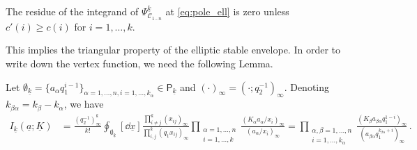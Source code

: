 \begin{lemma}
    The residue of the integrand of $\Psi_{\mathscr{C}_{1\ldots n}}^{\underline{k}}$ at \eqref{eq:pole_ell} is zero unless $c'(i) \ge c(i)$ for $i = 1 ,\ldots,k$.
\end{lemma}
This implies the triangular property of the elliptic stable envelope.
In order to write down the vertex function, we need the following Lemma.
\begin{lemma}\label{lemma:A1_pert}
    Let $\emptyset_{\underline{k}} = \{ a_\alpha q_1^{i-1} \}_{\alpha = 1,\ldots,n,i=1,\ldots,k_\alpha} \in \mathsf{P}_{\underline{k}}$ and $(\cdot)_\infty = (\cdot;q_2^{-1})_{\infty}$.
    Denoting $k_{\beta\alpha} = k_\beta - k_\alpha$, we have
\begin{align}
    I_{\underline{k}} (\underline{a};\underline{K}) 
    & = \frac{(q_2^{-1})_\infty^k}{k!} \oint_{\emptyset_{\underline{k}}} [\dd{\underline{x}}] \frac{\prod_{i \neq j}^k (x_{ij})_\infty}{\prod_{i,j}^k (q_1 x_{ij})_\infty} \prod_{\substack{\alpha = 1,\ldots,n \\ i = 1, \ldots, k}} \frac{(K_\alpha a_\alpha / x_i)_\infty}{(a_\alpha / x_i)_\infty}
    = \prod_{\substack{\alpha,\beta=1,\ldots,n \\ i = 1,\ldots,k_\alpha}} \frac{(K_\beta a_{\beta\alpha} q_1^{1-i})_\infty}{(a_{\beta\alpha} q_1^{k_{\beta\alpha}+i})_\infty} \, .
\end{align}
\end{lemma}
